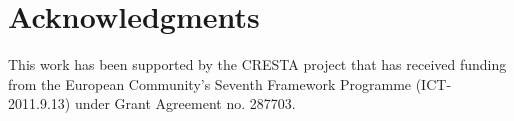 

\section*{Acknowledgments}
This work has been supported by the CRESTA project that has received
funding from the European Community's Seventh Framework Programme
(ICT-2011.9.13) under Grant Agreement no. 287703. 




%
%
%



